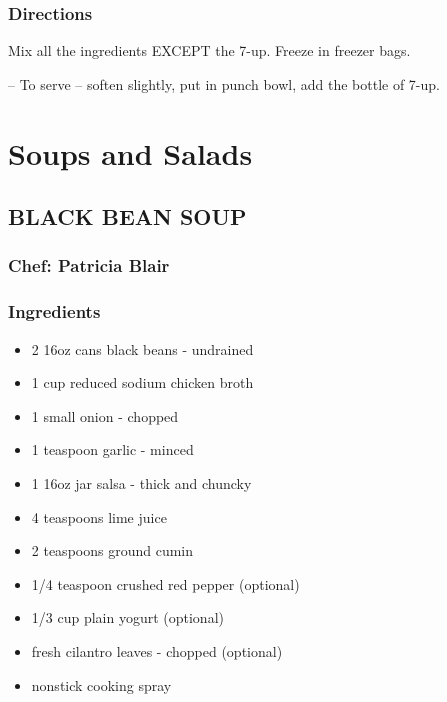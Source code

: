\documentclass[
]{book}
\providecommand{\tightlist}{%
  \setlength{\itemsep}{0pt}\setlength{\parskip}{0pt}}
\begin{document}
\hypertarget{directions-12}{%
\subsection*{Directions}\label{directions-12}}


Mix all the ingredients EXCEPT the 7-up. Freeze in freezer bags.

-- To serve -- soften slightly, put in punch bowl, add the bottle of 7-up.

\hypertarget{salad}{%
\chapter{Soups and Salads}\label{salad}}

\hypertarget{black-bean-soup}{%
\section*{BLACK BEAN SOUP}\label{black-bean-soup}}


\hypertarget{chef-patricia-blair-5}{%
\subsection*{Chef: Patricia Blair}\label{chef-patricia-blair-5}}


\hypertarget{ingredients-13}{%
\subsection*{Ingredients}\label{ingredients-13}}


\begin{itemize}
\tightlist
\item
  2 16oz cans black beans - undrained
\item
  1 cup reduced sodium chicken broth
\item
  1 small onion - chopped
\item
  1 teaspoon garlic - minced
\item
  1 16oz jar salsa - thick and chuncky
\item
  4 teaspoons lime juice
\item
  2 teaspoons ground cumin
\item
  1/4 teaspoon crushed red pepper (optional)
\item
  1/3 cup plain yogurt (optional)
\item
  fresh cilantro leaves - chopped (optional)
\item
  nonstick cooking spray
\end{itemize}
\end{document}
